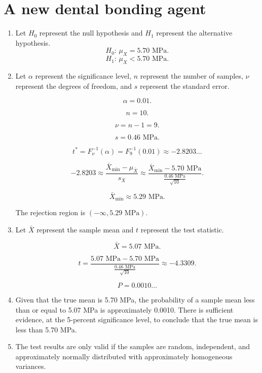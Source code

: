 \documentclass[12pt]{article}
\begin{document}
\section{A new dental bonding agent}
\begin{enumerate}
\item Let $H_0$ represent the null hypothesis and $H_1$ represent the alternative hypothesis.
\[H_0:\,\mu_X=5.70\text{ MPa}.\]
\[H_1:\,\mu_X<5.70\text{ MPa}.\]
\item Let $\alpha$ represent the significance level, $n$ represent the number of samples, $\nu$ represent the degrees of freedom, and $s$ represent the standard error.

\[\alpha=0.01.\]

\[n=10.\]

\[\nu=n-1=9.\]

\[s=0.46\text{ MPa}.\]

\[t^*=F^{-1}_\nu(\alpha)=F^{-1}_{9}(0.01)\approx -2.8203\dots\]

\[-2.8203\approx\frac{\bar{X}_{\text{min}}-\mu_{\bar{X}}}{s_{\bar{X}}}\approx\frac{\bar{X}_{\text{min}}-5.70\text{ MPa}}{\frac{0.46\text{ MPa}}{\sqrt{10}}}.\]

\[\bar{X}_{\text{min}}\approx 5.29\text{ MPa}.\]

The rejection region is $(-\infty,5.29\text{ MPa})$.
\item Let $\bar{X}$ represent the sample mean and $t$ represent the test statistic.

\[\bar{X}=5.07\text{ MPa}.\]

\[t=\frac{5.07\text{ MPa}-5.70\text{ MPa}}{\frac{0.46\text{ MPa}}{\sqrt{10}}}\approx -4.3309.\]

\[P=0.0010\dots\]

\item Given that the true mean is 5.70 MPa, the probability of a sample mean less than or equal to 5.07 MPa is approximately 0.0010. There is sufficient evidence, at the 5-percent significance level, to conclude that the true mean is less than 5.70 MPa.

\item The test results are only valid if the samples are random, independent, and approximately normally distributed with approximately homogeneous variances.
\end{enumerate}
\end{document}
